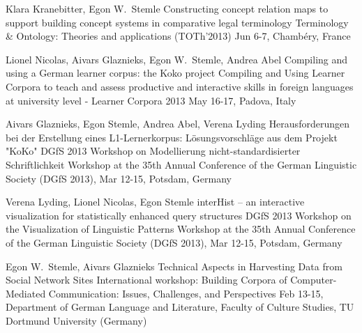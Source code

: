 \documentclass[11pt,a4paper]{moderncv}
\begin{document}
        {Klara Kranebitter, Egon W.~Stemle}
        {\small Constructing concept relation maps to support building concept
        systems in comparative legal terminology}
        {\small Terminology \& Ontology: Theories and applications (TOTh'2013)}
        {\small Jun 6-7, Chamb\'{e}ry, France}
        {}

        {Lionel Nicolas, Aivars Glaznieks, Egon W.~Stemle, Andrea Abel}
        {\small Compiling and using a German learner corpus: the Koko project}
        {\small Compiling and Using Learner Corpora to teach and assess
        productive and interactive skills in foreign languages at university
        level - Learner Corpora 2013}
        {\small May 16-17, Padova, Italy}
        {}

        {Aivars Glaznieks, Egon Stemle, Andrea Abel, Verena Lyding}
        {\small Herausforderungen bei der Erstellung eines L1-Lernerkorpus:
        Lösungsvorschläge aus dem Projekt "KoKo"}
        {\small DGfS 2013 Workshop on Modellierung nicht-standardisierter
        Schriftlichkeit}
        {\small Workshop at the 35th Annual Conference of the German Linguistic
        Society (DGfS 2013), Mar 12-15, Potsdam, Germany}
        {}

        {Verena Lyding, Lionel Nicolas, Egon Stemle}
        {\small interHist – an interactive visualization for statistically
        enhanced query structures}
        {\small DGfS 2013 Workshop on the Visualization of Linguistic Patterns}
        {\small Workshop at the 35th Annual Conference of the German Linguistic
        Society (DGfS 2013), Mar 12-15, Potsdam, Germany}
        {}


        {Egon W.~Stemle, Aivars Glaznieks}
        {\small Technical Aspects in Harvesting Data from Social Network Sites}
        {\small International workshop: Building Corpora of Computer-Mediated
        Communication: Issues, Challenges, and Perspectives}
        {\small Feb 13-15, Department of German Language and Literature, Faculty of
        Culture Studies, TU Dortmund University (Germany)}
        {}
\end{document}
